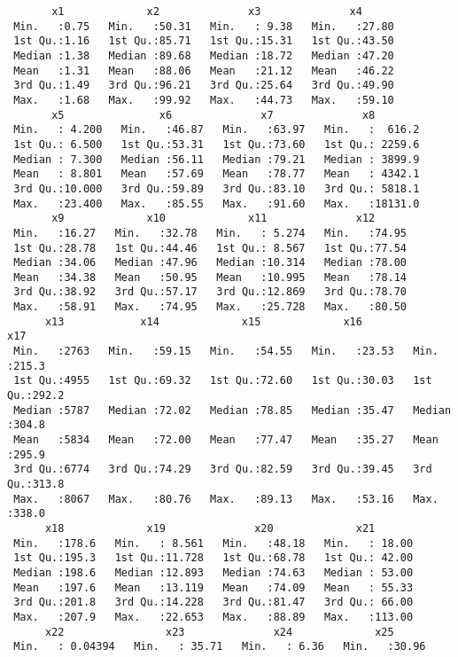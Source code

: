 \documentclass[12pt,twoside]{deuthesis}
\begin{document}
\begin{verbatim}
       x1             x2              x3              x4       
 Min.   :0.75   Min.   :50.31   Min.   : 9.38   Min.   :27.80  
 1st Qu.:1.16   1st Qu.:85.71   1st Qu.:15.31   1st Qu.:43.50  
 Median :1.38   Median :89.68   Median :18.72   Median :47.20  
 Mean   :1.31   Mean   :88.06   Mean   :21.12   Mean   :46.22  
 3rd Qu.:1.49   3rd Qu.:96.21   3rd Qu.:25.64   3rd Qu.:49.90  
 Max.   :1.68   Max.   :99.92   Max.   :44.73   Max.   :59.10  
       x5               x6              x7              x8         
 Min.   : 4.200   Min.   :46.87   Min.   :63.97   Min.   :  616.2  
 1st Qu.: 6.500   1st Qu.:53.31   1st Qu.:73.60   1st Qu.: 2259.6  
 Median : 7.300   Median :56.11   Median :79.21   Median : 3899.9  
 Mean   : 8.801   Mean   :57.69   Mean   :78.77   Mean   : 4342.1  
 3rd Qu.:10.000   3rd Qu.:59.89   3rd Qu.:83.10   3rd Qu.: 5818.1  
 Max.   :23.400   Max.   :85.55   Max.   :91.60   Max.   :18131.0  
       x9             x10             x11              x12       
 Min.   :16.27   Min.   :32.78   Min.   : 5.274   Min.   :74.95  
 1st Qu.:28.78   1st Qu.:44.46   1st Qu.: 8.567   1st Qu.:77.54  
 Median :34.06   Median :47.96   Median :10.314   Median :78.00  
 Mean   :34.38   Mean   :50.95   Mean   :10.995   Mean   :78.14  
 3rd Qu.:38.92   3rd Qu.:57.17   3rd Qu.:12.869   3rd Qu.:78.70  
 Max.   :58.91   Max.   :74.95   Max.   :25.728   Max.   :80.50  
      x13            x14             x15             x16             x17       
 Min.   :2763   Min.   :59.15   Min.   :54.55   Min.   :23.53   Min.   :215.3  
 1st Qu.:4955   1st Qu.:69.32   1st Qu.:72.60   1st Qu.:30.03   1st Qu.:292.2  
 Median :5787   Median :72.02   Median :78.85   Median :35.47   Median :304.8  
 Mean   :5834   Mean   :72.00   Mean   :77.47   Mean   :35.27   Mean   :295.9  
 3rd Qu.:6774   3rd Qu.:74.29   3rd Qu.:82.59   3rd Qu.:39.45   3rd Qu.:313.8  
 Max.   :8067   Max.   :80.76   Max.   :89.13   Max.   :53.16   Max.   :338.0  
      x18             x19              x20             x21        
 Min.   :178.6   Min.   : 8.561   Min.   :48.18   Min.   : 18.00  
 1st Qu.:195.3   1st Qu.:11.728   1st Qu.:68.78   1st Qu.: 42.00  
 Median :198.6   Median :12.893   Median :74.63   Median : 53.00  
 Mean   :197.6   Mean   :13.119   Mean   :74.09   Mean   : 55.33  
 3rd Qu.:201.8   3rd Qu.:14.228   3rd Qu.:81.47   3rd Qu.: 66.00  
 Max.   :207.9   Max.   :22.653   Max.   :88.89   Max.   :113.00  
      x22                x23              x24             x25       
 Min.   : 0.04394   Min.   : 35.71   Min.   : 6.36   Min.   :30.96  

\end{verbatim}
\end{document}
